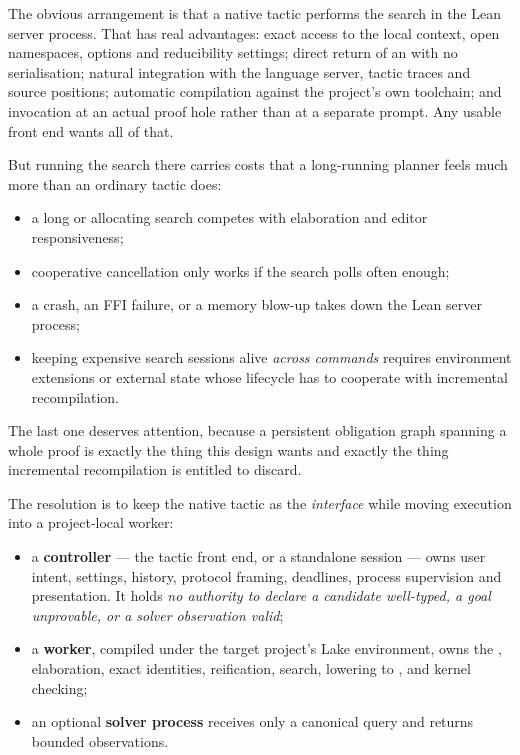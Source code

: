 The obvious arrangement is that a native tactic performs the search in the Lean
server process. That has real advantages: exact access to the local context,
open namespaces, options and reducibility settings; direct return of an
 with no serialisation; natural integration with the language
server, tactic traces and source positions; automatic compilation against the
project's own toolchain; and invocation at an actual proof hole rather than at
a separate prompt. Any usable front end wants all of that.

But running the search there carries costs that a long-running planner feels
much more than an ordinary tactic does:

\begin{itemize}[leftmargin=1.4em]
\item a long or allocating search competes with elaboration and editor
  responsiveness;
\item cooperative cancellation only works if the search polls often enough;
\item a crash, an FFI failure, or a memory blow-up takes down the Lean server
  process;
\item keeping expensive search sessions alive \emph{across commands} requires
  environment extensions or external state whose lifecycle has to cooperate
  with incremental recompilation.
\end{itemize}

The last one deserves attention, because a persistent obligation graph spanning
a whole proof is exactly the thing this design wants and exactly the thing
incremental recompilation is entitled to discard.

The resolution is to keep the native tactic as the \emph{interface} while
moving execution into a project-local worker:

\begin{itemize}[leftmargin=1.4em]
\item a \textbf{controller} --- the tactic front end, or a standalone
  session --- owns user intent, settings, history, protocol framing, deadlines,
  process supervision and presentation. It holds \emph{no authority to declare
  a candidate well-typed, a goal unprovable, or a solver observation valid};
\item a \textbf{worker}, compiled under the target project's Lake environment,
  owns the , elaboration, exact identities, reification,
  search, lowering to , and kernel checking;
\item an optional \textbf{solver process} receives only a canonical query and
  returns bounded observations.
\end{itemize}

